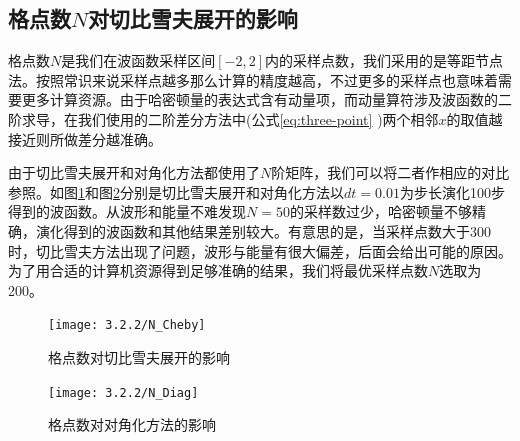 \subsection{格点数$N$对切比雪夫展开的影响}
格点数$N$是我们在波函数采样区间$\left[-2,2\right]$内的采样点数，我们采用的是等距节点法。按照常识来说采样点越多那么计算的精度越高，不过更多的采样点也意味着需要更多计算资源。由于哈密顿量的表达式含有动量项，而动量算符涉及波函数的二阶求导，在我们使用的二阶差分方法中(公式\ref{eq:three-point} )两个相邻$x$的取值越接近则所做差分越准确。

由于切比雪夫展开和对角化方法都使用了$N$阶矩阵，我们可以将二者作相应的对比参照。如图\ref{fig:N_Cheby}和图\ref{fig:N_Diag}分别是切比雪夫展开和对角化方法以$dt=0.01$为步长演化100步得到的波函数。从波形和能量不难发现$N=50$的采样数过少，哈密顿量不够精确，演化得到的波函数和其他结果差别较大。有意思的是，当采样点数大于300时，切比雪夫方法出现了问题，波形与能量有很大偏差，后面会给出可能的原因。为了用合适的计算机资源得到足够准确的结果，我们将最优采样点数$N$选取为200。

\begin{figure}[h]
  \centering
  \captionsetup{justification=centering}
  \vspace{1mm}
  \texttt{[image: 3.2.2/N\_Cheby]}
  \caption{格点数对切比雪夫展开的影响 \label{fig:N_Cheby}}
\end{figure}
\begin{figure}[h]
  \centering
  \captionsetup{justification=centering}
  \vspace{1mm}
  \texttt{[image: 3.2.2/N\_Diag]}
  \caption{格点数对对角化方法的影响 \label{fig:N_Diag}}
\end{figure}

